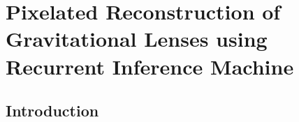 \chapter{Pixelated Reconstruction of Gravitational Lenses using Recurrent Inference Machine}\label{chap:censai}
\thispagestyle{empty}







\section{Introduction}


